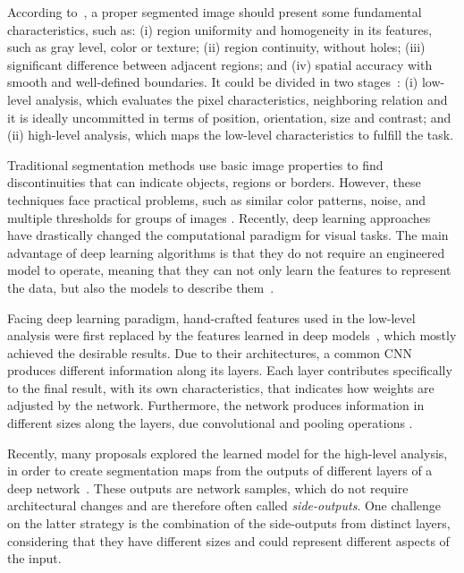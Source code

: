 According to~\cite{Dominguez:2016}, a proper segmented image should present some fundamental characteristics, such as: (i) region uniformity and homogeneity in  its features, such as gray level, color or texture; (ii) region continuity, without holes; (iii) significant difference between adjacent regions; and (iv) spatial accuracy with smooth and well-defined boundaries.
It could be divided in two stages~\cite{Guigues:2006}: (i) low-level analysis, which evaluates the pixel characteristics, neighboring relation and it is ideally uncommitted in terms of position, orientation, size and contrast; and (ii) high-level analysis, which maps the low-level characteristics to fulfill the task.

Traditional segmentation methods use basic image properties to find discontinuities that can indicate objects, regions or borders.
However, these techniques face practical problems, such as similar color patterns, noise, and multiple thresholds for groups of images \cite{MARTIN:1273918} \cite{Segnet:2017:7803544}.
Recently, deep learning approaches have drastically changed the computational paradigm for visual tasks. The main advantage of deep learning algorithms is that they do not require an engineered model to operate, meaning that they can not only learn the features to represent the data, but also the models to describe them~\cite{Goodfellow:2016}.

Facing deep learning paradigm, hand-crafted features used in the low-level analysis were first replaced by the features learned in deep models~\cite{Farabet:2013, VGGNET:2014, Lee:2015}, which mostly achieved the desirable results.
Due to their architectures, a common CNN produces different information along its layers.
Each layer contributes specifically to the final result, with its own characteristics, that indicates how weights are adjusted by the network.
Furthermore, the network produces information in different sizes along the layers, due convolutional and pooling operations \cite{VGGNET:2014, Zeiler:2014, Fidler:2007, Hadji:2018}. %

Recently, many proposals explored the learned model for the high-level analysis, in order to create segmentation maps from the outputs of different layers of a deep network~\cite{Xie:2017:HED:3158436.3158453, Cheng:2016, COB:2016, RCF:2017:8100105, Yang:2018}.
These outputs are network samples, which do not require architectural changes and are therefore often called \textit{side-outputs}.
One challenge on the latter strategy is the combination of the side-outputs from distinct layers, considering that they have different sizes and could represent different aspects of the input.


